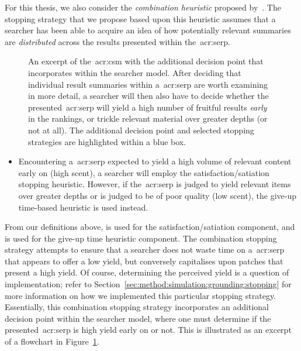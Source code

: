 For this thesis, we also consider the \emph{combination heuristic} proposed by~\cite{mcnair1982gut_mvt}. The stopping strategy that we propose based upon this heuristic assumes that a searcher has been able to acquire an idea of how potentially relevant summaries are \emph{distributed} across the results presented within the~\gls{acr:serp}.

\begin{figure}[t!]
    \centering
    \caption[Flowchart of the flow of stopping strategy ]{An excerpt of the~\gls{acr:csm} with the additional decision point that  incorporates within the searcher model. After deciding that individual result summaries within a~\gls{acr:serp} are worth examining in more detail, a searcher will then also have to decide whether the presented~\gls{acr:serp} will yield a high number of fruitful results \emph{early} in the rankings, or trickle relevant material over greater depths (or not at all). The additional decision point and selected stopping strategies are highlighted within a blue box.}
    \label{fig:ss11_combo}
\end{figure}

\begin{itemize}
    \item{ Encountering a~\gls{acr:serp} expected to yield a high volume of relevant content early on (high scent), a searcher will employ the satisfaction/satiation stopping heuristic. However, if the~\gls{acr:serp} is judged to yield relevant items over greater depths or is judged to be of poor quality (low scent), the give-up time-based heuristic is used instead.}
\end{itemize}

From our definitions above,  is used for the satisfaction/satiation component, and  is used for the give-up time heuristic component. The combination stopping strategy attempts to ensure that a searcher does not waste time on a~\gls{acr:serp} that appears to offer a low yield, but conversely capitalises upon patches that present a high yield. Of course, determining the perceived yield is a question of implementation; refer to Section~\ref{sec:method:simulation:grounding:stopping} for more information on how we implemented this particular stopping strategy. Essentially, this combination stopping strategy incorporates an additional decision point within the searcher model, where one must determine if the presented~\gls{acr:serp} is high yield early on or not. This is illustrated as an excerpt of a flowchart in Figure~\ref{fig:ss11_combo}.

